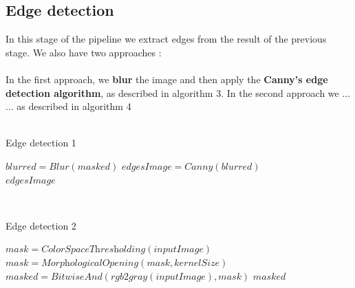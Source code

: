 \documentclass[journal]{IEEEtran}
\begin{document}
\subsection{Edge detection}
In this stage of the pipeline we extract edges from the result of the previous stage. We also have two approaches :
\\
\\
In the first approach, we \textbf{blur} the image and then apply the \textbf{Canny's edge detection algorithm}, as described in algorithm 3. In the second approach we ... %
 ... as described in algorithm 4
\\
\\
\begin{algorithm}
\caption{Edge detection 1}
\begin{algorithmic}[1]
\State $blurred    = \textit{Blur}(masked)$
\State $edgesImage = \textit{Canny}(blurred)$\\
\Return $edgesImage$
\end{algorithmic}
\end{algorithm}
\\
\begin{algorithm}
\caption{Edge detection 2}
\begin{algorithmic}[1]
\State $mask   = \textit{ColorSpaceThresholding}(inputImage)$
\State $mask   = \textit{MorphologicalOpening}(mask, kernelSize)$
\State $masked = \textit{BitwiseAnd}( \textit{rgb2gray}( inputImage ), mask )$
\Return $masked$
\end{algorithmic}
\end{algorithm}
\\
\\
\end{document}
